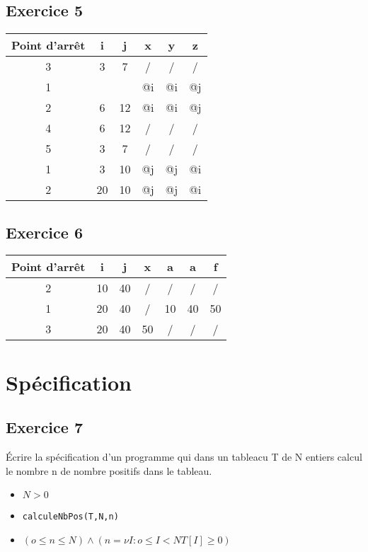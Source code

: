 \subsection{Exercice 5}

\begin{center}
\begin{tabular}{c |  c  c  c  c  c  }
	\textbf{Point d'arrêt} & \textbf{i} & \textbf{j} & \textbf{x} & \textbf{y} & \textbf{z}\\
	\hline
	3 & 3 & 7 &/ &/&/\\
	\hline
	1 & &&@i&@i&@j\\
	\hline
	2 & 6 & 12 & @i & @i & @j\\
	\hline
	4 & 6 & 12 & / & / & /\\
	\hline
	5 & 3 & 7 & / & / & / \\
	\hline
	1 & 3&10 &@j&@j&@i\\
	\hline
	2 & 20 & 10 & @j&@j&@i\\
	\hline
\end{tabular}
\end{center}
\newpage
\subsection{Exercice 6}
 
\begin{tabular}{c |  c  c  c  c  c  c  }
	\textbf{Point d'arrêt} & \textbf{i} & \textbf{j} & \textbf{x} & \textbf{a} & \textbf{a} & \textbf{f}\\
	\hline
	2&10&40&/&/&/&/\\
	\hline
	1 & 20 & 40 & / & 10 & 40 & 50\\
	\hline
	3 & 20 & 40 & 50 & / & / & /\\
	\hline
\end{tabular}

\section{Spécification}
\subsection{Exercice 7}
	\'Ecrire la spécification d'un programme qui dans un tableacu T de N entiers calcul le nombre n de nombre positifs dans le tableau.

	\begin{itemize}
		\item $N > 0$
		\item \texttt{calculeNbPos(T,N,n)}
		\item $(o \leq n \leq N) \wedge (n = \nu I : o \leq I < N T[I] \geq 0) $
	\end{itemize}
